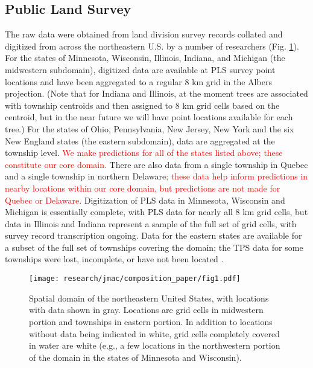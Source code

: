 \documentclass[12pt]{article}\usepackage[]{graphicx}\usepackage[]{color}
\begin{document}
\subsection{Public Land Survey}

The raw data were obtained from land division survey records collated
and digitized from across the northeastern U.S. by a number of researchers
(Fig. \ref{fig:Spatial-domain}). For the states of Minnesota, Wisconsin,
Illinois, Indiana, and Michigan (the midwestern subdomain), digitized
data are available at PLS survey point locations and have been aggregated
to a regular 8 km grid in the Albers projection. (Note that for Indiana
and Illinois, at the moment trees are associated with township centroids
and then assigned to 8 km grid cells based on the centroid, but in
the near future we will have point locations available for each tree.)
For the states of Ohio, Pennsylvania, New Jersey, New York and the
six New England states (the eastern subdomain), data are aggregated
at the township level. \textcolor{red}{We make predictions for all
of the states listed above; these constitute our core domain. }There
are also data from a single township in Quebec and a single township
in northern Delaware\textcolor{red}{; these data help inform predictions
in nearby locations within our core domain, but predictions are not
made for Quebec or Delaware}. Digitization of PLS data in Minnesota,
Wisconsin and Michigan is essentially complete, with PLS data for
nearly all 8 km grid cells, but data in Illinois and Indiana represent
a sample of the full set of grid cells, with survey record transcription
ongoing. Data for the eastern states are available for a subset of
the full set of townships covering the domain; the TPS data for some
townships were lost, incomplete, or have not been located \citep{Cogb:etal:2002}. 

\begin{figure}
\label{fig:domain}\texttt{[image: research/jmac/composition\_paper/fig1.pdf]}

\caption{Spatial domain of the northeastern United States, with locations with
data shown in gray. Locations are grid cells in midwestern portion
and townships in eastern portion. In addition to locations without
data being indicated in white, grid cells completely covered in water
are white (e.g., a few locations in the northwestern portion of the
domain in the states of Minnesota and Wisconsin).\label{fig:Spatial-domain}}
\end{figure}
\end{document}

